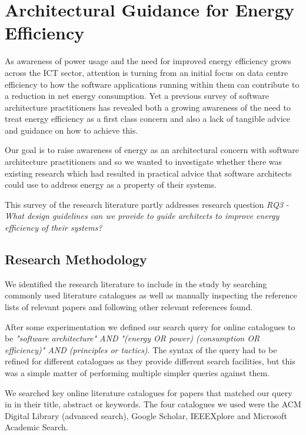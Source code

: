 \section{Architectural Guidance for Energy Efficiency}
\label{section:litreview-energyguidance}


As awareness of power usage and the need for improved energy efficiency grows across the ICT sector, attention is turning from an initial focus on data centre efficiency \cite{delforge2014-datacentreenergy} to how the software applications running within them can contribute to a reduction in net energy consumption.  Yet a previous survey of software architecture practitioners \cite{bashroush2016-datacentreenergy} has revealed both a growing awareness of the need to treat energy efficiency as a first class concern and also a lack of tangible advice and guidance on how to achieve this.

Our goal is to raise awareness of energy as an architectural concern with software architecture practitioners and so we wanted to investigate whether there was existing research which had resulted in practical advice that software architects could use to address energy as a property of their systems.

This survey of the research literature partly addresses research question \emph{RQ3 -  What design guidelines can we provide to guide architects to improve energy efficiency of their systems?}

\subsection{Research Methodology}

We identified the research literature to include in the study by searching commonly used literature catalogues as well as manually inspecting the reference lists of relevant papers and following other relevant references found.

After some experimentation we defined our search query for online catalogues to be \emph{"software architecture" AND "(energy OR power) (consumption OR efficiency)" AND (principles or tactics)}.  The syntax of the query had to be refined for different catalogues as they provide different search facilities, but this was a simple matter of performing multiple simpler queries against them.

We searched key online literature catalogues for papers that matched our query in in their title, abstract or keywords.  The four catalogues we used were the ACM Digital Library (advanced search), Google Scholar, IEEEXplore and Microsoft Academic Search.

